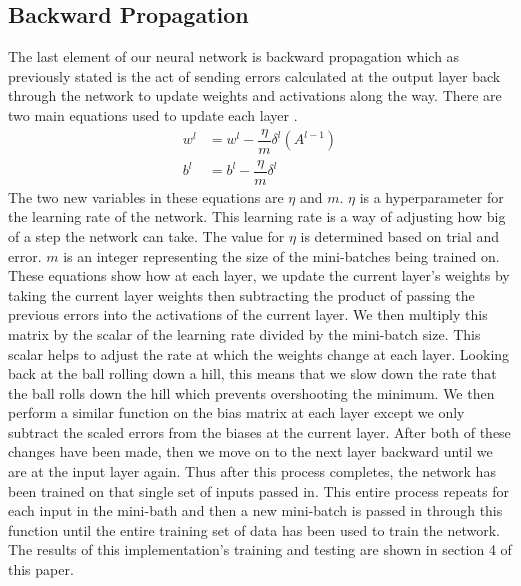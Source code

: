 \documentclass[12pt]{article}
\theoremstyle{definition}
\theoremstyle{plain}
\begin{document}
\subsection{Backward Propagation}
The last element of our neural network is backward propagation which as previously stated is the act of sending errors calculated at the output layer back through the network to update weights and activations along the way. There are two main equations used to update each layer \cite{nielsen_2017}.
\begin{align}\label{eqn:backprop}
w^l &= w^l - \dfrac{\eta}{m}\delta^l(A^{l-1})\\
b^l &= b^l - \dfrac{\eta}{m}\delta^l
\end{align}
The two new variables in these equations are $\eta$ and $m$. $\eta$ is a hyperparameter for the learning rate of the network. This learning rate is a way of adjusting how big of a step the network can take. The value for $\eta$ is determined based on trial and error. $m$ is an integer representing the size of the mini-batches being trained on. These equations show how at each layer, we update the current layer's weights by taking the current layer weights then subtracting the product of passing the previous errors into the activations of the current layer. We then multiply this matrix by the scalar of the learning rate divided by the mini-batch size. This scalar helps to adjust the rate at which the weights change at each layer. Looking back at the ball rolling down a hill, this means that we slow down the rate that the ball rolls down the hill which prevents overshooting the minimum. We then perform a similar function on the bias matrix at each layer except we only subtract the scaled errors from the biases at the current layer. After both of these changes have been made, then we move on to the next layer backward until we are at the input layer again. Thus after this process completes, the network has been trained on that single set of inputs passed in. This entire process repeats for each input in the mini-bath and then a new mini-batch is passed in through this function until the entire training set of data has been used to train the network. The results of this implementation's training and testing are shown in section 4 of this paper.
\end{document}
